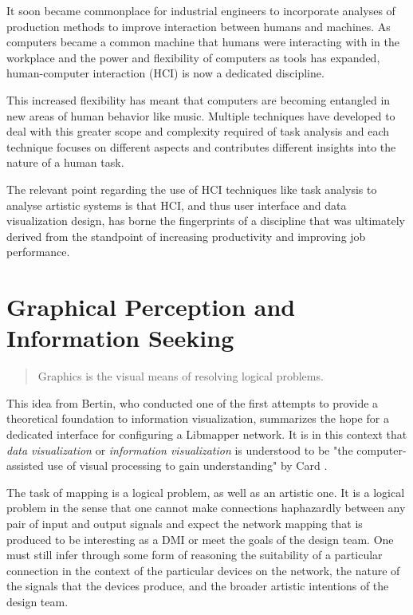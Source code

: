 It soon became commonplace for industrial engineers to incorporate analyses of production methods to improve interaction between humans and machines. As computers became a common machine that humans were interacting with in the workplace and the power and flexibility of computers as tools has expanded, human-computer interaction (HCI) is now a dedicated discipline. 

This increased flexibility has meant that computers are becoming entangled in new areas of human behavior like music. Multiple techniques have developed to deal with this greater scope and complexity required of task analysis and each technique focuses on different aspects and contributes different insights into the nature of a human task.

The relevant point regarding the use of HCI techniques like task analysis to analyse artistic systems is that HCI, and thus user interface and data visualization design, has borne the fingerprints of a discipline that was ultimately derived from the standpoint of increasing productivity and improving job performance. 

\section{Graphical Perception and Information Seeking}

\begin{quote}
Graphics is the visual means of resolving logical problems. \cite{bertin1981}
\end{quote}

This idea from Bertin, who conducted one of the first attempts to provide a theoretical foundation to information visualization, summarizes the hope for a dedicated interface for configuring a Libmapper network. It is in this context that \emph{data visualization} or \emph{information visualization} is understood to be "the computer-assisted use of visual processing to gain understanding" by Card \cite{card1997}. 

The task of mapping is a logical problem, as well as an artistic one. It is a logical problem in the sense that one cannot make connections haphazardly between any pair of input and output signals and expect the network mapping that is produced to be interesting as a DMI or meet the goals of the design team. One must still infer through some form of reasoning the suitability of a particular connection in the context of the particular devices on the network, the nature of the signals that the devices produce, and the broader artistic intentions of the design team. 

